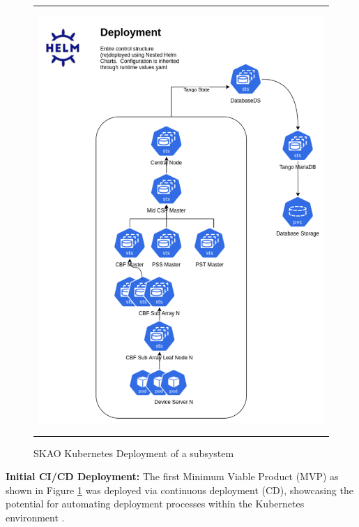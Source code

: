 \documentclass[a4paper]{spie}  %
\begin{document}
   \begin{figure} [ht]
   \begin{center}
   \begin{tabular}{c} %
   \includegraphics[height=16cm]{deployments.png}
   \end{tabular}
   \end{center}
   \caption 
   { \label{fig:deployment}
SKAO Kubernetes Deployment of a subsystem}
    \end{figure} 

\noindent\textbf{Initial CI/CD Deployment:} The first Minimum Viable Product (MVP) as shown in Figure \ref{fig:deployment} was deployed via continuous deployment (CD), showcasing the potential for automating deployment processes within the Kubernetes environment \cite{di_carlo_ci-cd_2020}. 
\end{document}
